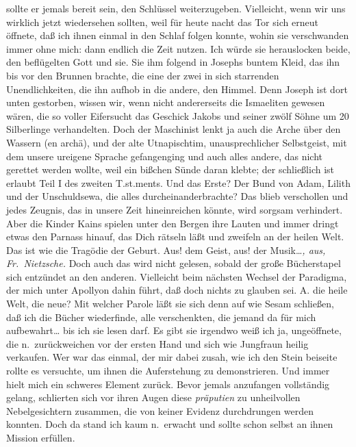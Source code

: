 \documentclass[
]{article}
\begin{document}
sollte er jemals bereit sein, den Schlüssel weiterzugeben. Vielleicht,
wenn wir uns wirklich jetzt wiedersehen sollten, weil für heute nacht
das Tor sich erneut öffnete, daß ich ihnen einmal in den Schlaf folgen
konnte, wohin sie verschwanden immer ohne mich: dann endlich die Zeit
nutzen. Ich würde sie herauslocken beide, den beflügelten Gott und sie.
Sie ihm folgend in Josephs buntem Kleid, das ihn bis vor den Brunnen
brachte, die eine der zwei in sich starrenden Unendlichkeiten, die ihn
aufhob in die andere, den Himmel. Denn Joseph ist dort unten gestorben,
wissen wir, wenn nicht andererseits die Ismaeliten gewesen wären, die so
voller Eifersucht das Geschick Jakobs und seiner zwölf Söhne um 20
Silberlinge verhandelten. Doch der Maschinist lenkt ja auch die Arche
über den Wassern (en archä), und der alte Utnapischtim, unausprechlicher
Selbstgeist, mit dem unsere ureigene Sprache gefangenging und auch alles
andere, das nicht gerettet werden wollte, weil ein bißchen Sünde daran
klebte; der schließlich ist erlaubt Teil I des zweiten T.st.ments. Und
das Erste? Der Bund von Adam, Lilith und der Unschuldsewa, die alles
durcheinanderbrachte? Das blieb verschollen und jedes Zeugnis, das in
unsere Zeit hineinreichen könnte, wird sorgsam verhindert. Aber die
Kinder Kains spielen unter den Bergen ihre Lauten und immer dringt etwas
den Parnass hinauf, das Dich rätseln läßt und zweifeln an der heilen
Welt. Das ist wie die Tragödie der Geburt. Aus! dem Geist, aus! der
Musik\ldots{}\emph{, aus, Fr.~Nietzsche. }Doch auch das wird nicht
gelesen, sobald der große Bücherstapel sich entzündet an den anderen.
Vielleicht beim nächsten Wechsel der Paradigma, der mich unter Apollyon
dahin führt, daß doch nichts zu glauben sei. A. die heile Welt, die
neue? Mit welcher Parole läßt sie sich denn auf wie Sesam schließen, daß
ich die Bücher wiederfinde, alle verschenkten, die jemand da für mich
aufbewahrt\ldots{} bis ich sie lesen darf. Es gibt sie irgendwo weiß ich
ja, ungeöffnete, die n.~zurückweichen vor der ersten Hand und sich wie
Jungfraun heilig verkaufen. Wer war das einmal, der mir dabei zusah, wie
ich den Stein beiseite rollte es versuchte, um ihnen die Auferstehung zu
demonstrieren. Und immer hielt mich ein schweres Element zurück. Bevor
jemals anzufangen vollständig gelang, schlierten sich vor ihren Augen
diese \emph{präputien }zu unheilvollen Nebelgesichtern zusammen, die von
keiner Evidenz durchdrungen werden konnten. Doch da stand ich kaum
n.~erwacht und sollte schon selbst an ihnen Mission erfüllen.
\end{document}
